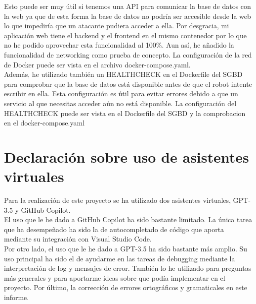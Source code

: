 \documentclass{report}
\begin{document}
                Esto puede ser muy útil si tenemos una API para comunicar la base de datos con la web ya que de esta forma la base de datos no podría ser accesible desde la web lo que impediría que un atacante pudiera acceder a ella.
                Por desgracia, mi aplicación web tiene el backend y el frontend en el mismo contenedor por lo que no he podido aprovechar esta funcionalidad al 100\%.
                Aun así, he añadido la funcionalidad de networking como prueba de concepto.
                La configuración de la red de Docker puede ser vista en el archivo docker-compose.yaml.\\

                Además, he utilizado también un HEALTHCHECK en el Dockerfile del SGBD para comprobar que la base de datos está disponible antes de que el robot intente escribir en ella.
                Esta configuración es útil para evitar errores debido a que un servicio al que necesitas acceder aún no está disponible.
                La configuración del HEALTHCHECK puede ser vista en el Dockerfile del SGBD y la comprobacion en el docker-compose.yaml\\
        \clearpage
    \chapter{Declaración sobre uso de asistentes virtuales}
        Para la realización de este proyecto se ha utilizado dos asistentes virtuales, GPT-3.5 y GitHub Copilot.\\

        El uso que le he dado a GitHub Copilot ha sido bastante limitado.
        La única tarea que ha desempeñado ha sido la de autocompletado de código que aporta mediante su integración con Visual Studio Code.\\

        Por otro lado, el uso que le he dado a GPT-3.5 ha sido bastante más amplio.
        Su uso principal ha sido el de ayudarme en las tareas de debugging mediante la interpretación de log y mensajes de error.
        También lo he utilizado para preguntas más generales y para aportarme ideas sobre que podía implementar en el proyecto.
        Por último, la corrección de errores ortográficos y gramaticales en este informe.\\
\end{document}
